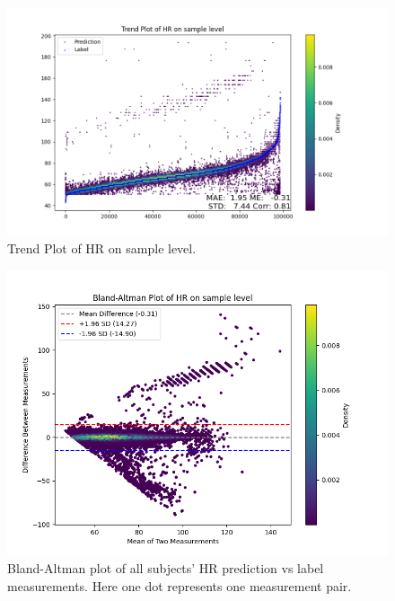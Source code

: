 \documentclass{article}
\begin{document}
\begin{figure}[H]
\centering
\includegraphics[width=\textwidth]{./Fig/Trend_Plot_HR_on_sample_level.png}
\caption{Trend Plot of HR on sample level.}
\label{fig:image1}
\end{figure}

\begin{figure}[H]
\centering
\includegraphics[width=\textwidth]{./Fig/Bland_Altman_Plot_HR_on_sample_level.png}
\caption{Bland-Altman plot of all subjects' HR prediction vs label measurements. Here one dot represents one measurement pair.}
\label{fig:image1}
\end{figure}
\end{document}
